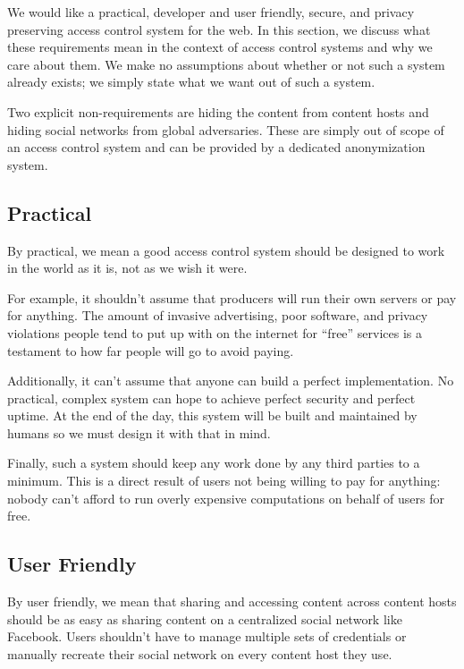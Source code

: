 \documentclass[pdftex,12pt,a4papaer,twoside,notitlepage]{report}
\begin{document}
We would like a practical, developer and user friendly, secure, and privacy
preserving access control system for the web. In this section, we discuss what
these requirements mean in the context of access control systems and why we care
about them. We make no assumptions about whether or not such a system already
exists; we simply state what we want out of such a system.

Two explicit non-requirements are hiding the content from content hosts and
hiding social networks from global adversaries. These are simply out of scope of
an access control system and can be provided by a dedicated anonymization system.

\subsection{Practical}

By practical, we mean a good access control system should be designed to work in
the world as it is, not as we wish it were.

For example, it shouldn't assume that producers will run their own servers or
pay for anything. The amount of invasive advertising, poor software, and privacy
violations people tend to put up with on the internet for ``free'' services is a
testament to how far people will go to avoid paying.

Additionally, it can't assume that anyone can build a perfect implementation. No
practical, complex system can hope to achieve perfect security and perfect
uptime. At the end of the day, this system will be built and maintained by
humans so we must design it with that in mind.

Finally, such a system should keep any work done by any third parties to a
minimum. This is a direct result of users not being willing to pay for anything:
nobody can't afford to run overly expensive computations on behalf of users for
free.

\subsection{User Friendly}
\label{sub:goal-user}

By user friendly, we mean that sharing and accessing content across content
hosts should be as easy as sharing content on a centralized social network like
Facebook. Users shouldn't have to manage multiple sets of credentials or
manually recreate their social network on every content host they use.
\end{document}
